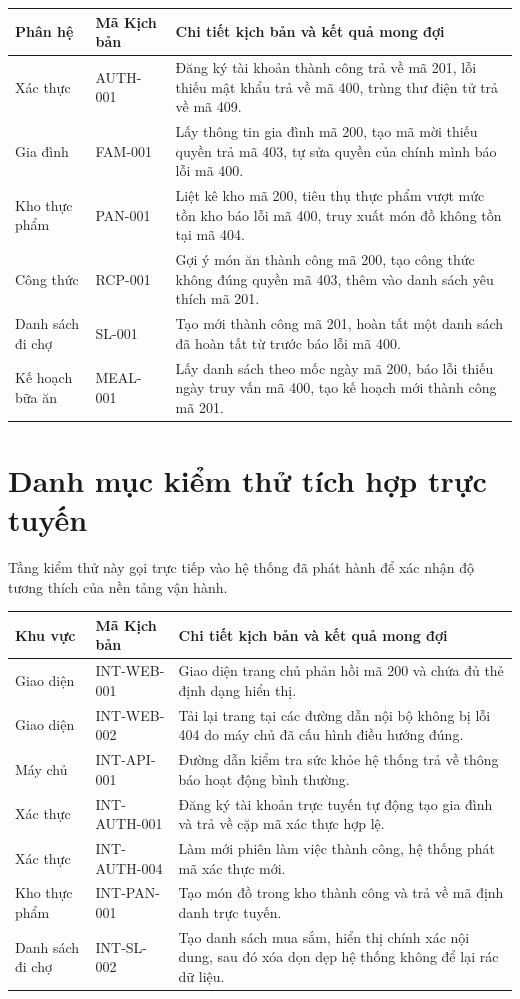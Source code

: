 \documentclass[../main.tex]{subfiles}
\begin{document}
\begin{longtable}{|p{}|p{}|p{}|}
\hline
\textbf{Phân hệ} & \textbf{Mã Kịch bản} & \textbf{Chi tiết kịch bản và kết quả mong đợi} \\
\hline
Xác thực & AUTH-001 & Đăng ký tài khoản thành công trả về mã 201, lỗi thiếu mật khẩu trả về mã 400, trùng thư điện tử trả về mã 409. \\
\hline
Gia đình & FAM-001 & Lấy thông tin gia đình mã 200, tạo mã mời thiếu quyền trả mã 403, tự sửa quyền của chính mình báo lỗi mã 400. \\
\hline
Kho thực phẩm & PAN-001 & Liệt kê kho mã 200, tiêu thụ thực phẩm vượt mức tồn kho báo lỗi mã 400, truy xuất món đồ không tồn tại mã 404. \\
\hline
Công thức & RCP-001 & Gợi ý món ăn thành công mã 200, tạo công thức không đúng quyền mã 403, thêm vào danh sách yêu thích mã 201. \\
\hline
Danh sách đi chợ & SL-001 & Tạo mới thành công mã 201, hoàn tất một danh sách đã hoàn tất từ trước báo lỗi mã 400. \\
\hline
Kế hoạch bữa ăn & MEAL-001 & Lấy danh sách theo mốc ngày mã 200, báo lỗi thiếu ngày truy vấn mã 400, tạo kế hoạch mới thành công mã 201. \\
\hline
\end{longtable}

\section{Danh mục kiểm thử tích hợp trực tuyến}
Tầng kiểm thử này gọi trực tiếp vào hệ thống đã phát hành để xác nhận độ tương thích của nền tảng vận hành.

\begin{longtable}{|p{}|p{}|p{}|}
\hline
\textbf{Khu vực} & \textbf{Mã Kịch bản} & \textbf{Chi tiết kịch bản và kết quả mong đợi} \\
\hline
Giao diện & INT-WEB-001 & Giao diện trang chủ phản hồi mã 200 và chứa đủ thẻ định dạng hiển thị. \\
\hline
Giao diện & INT-WEB-002 & Tải lại trang tại các đường dẫn nội bộ không bị lỗi 404 do máy chủ đã cấu hình điều hướng đúng. \\
\hline
Máy chủ & INT-API-001 & Đường dẫn kiểm tra sức khỏe hệ thống trả về thông báo hoạt động bình thường. \\
\hline
Xác thực & INT-AUTH-001 & Đăng ký tài khoản trực tuyến tự động tạo gia đình và trả về cặp mã xác thực hợp lệ. \\
\hline
Xác thực & INT-AUTH-004 & Làm mới phiên làm việc thành công, hệ thống phát mã xác thực mới. \\
\hline
Kho thực phẩm & INT-PAN-001 & Tạo món đồ trong kho thành công và trả về mã định danh trực tuyến. \\
\hline
Danh sách đi chợ & INT-SL-002 & Tạo danh sách mua sắm, hiển thị chính xác nội dung, sau đó xóa dọn dẹp hệ thống không để lại rác dữ liệu. \\
\hline
\end{longtable}
\end{document}
